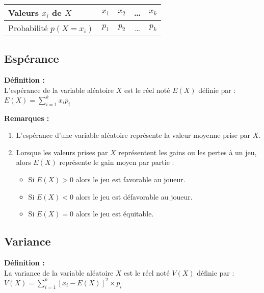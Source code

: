 \documentclass{article}
\begin{document}
\begin{center}
    \renewcommand{\arraystretch}{1.6}
    \begin{tabular}{|l|c|c|c|c|}
        \hline
        Valeurs $x_i$ de $X$ & $x_1$      & $x_2$      & \quad\text{ }\dots\quad\text{ } & $x_k$      \\
        \hline
        Probabilité $p(X=x_i)$      & $p_1$ & $p_2$ & \quad\text{ }\dots\quad\text{ } & $p_k$ \\
        \hline
    \end{tabular}
\end{center}

\subsection{Espérance}

\begin{mdframed}[style=definitionStyle]
    \textbf{Définition :} ~\\
    L'espérance de la variable aléatoire $X$ est le réel noté $E(X)$ définie par : \\
    $\displaystyle E(X)=\sum_{i=1}^{k}x_ip_i$          
\end{mdframed}

\textbf{Remarques :}
\begin{enumerate}
  \item L'espérance d'une variable aléatoire représente la valeur moyenne prise par $X$.
  \item Lorsque les valeurs prises par $X$ représentent les gains ou les pertes à un jeu, alors $E(X)$ représente le gain moyen par partie :
  \vspace*{-4pt}
  \begin{itemize}
      \item Si $E(X)>0$ alors le jeu est favorable au joueur.
      \item Si $E(X)<0$ alors le jeu est défavorable au joueur.
      \item Si $E(X)=0$ alors le jeu est équitable.
  \end{itemize}
\end{enumerate}

\subsection{Variance}

\begin{mdframed}[style=definitionStyle]
    \textbf{Définition :} ~\\
    La variance de la variable aléatoire $X$ est le réel noté $V(X)$ définie par :\\
    $\displaystyle V(X)=\sum_{i=1}^{k}\left[x_i-E(X)\right]^2\times p_i$
\end{mdframed}
\end{document}
